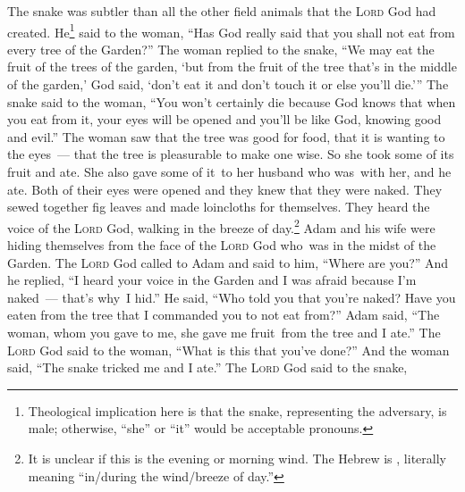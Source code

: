 
\begin{inparaenum}
     The snake was subtler than all the other field animals that the \textsc{Lord} God had created. He\footnote{Theological implication here is that the snake, representing the adversary, is male; otherwise, ``she'' or ``it'' would be acceptable pronouns.} said to the woman, ``Has God really said that you shall not eat from every tree of the Garden?''%
     The woman replied to the snake, ``We may eat the fruit of the trees of the garden,%
     `but from the fruit of the tree that's in the middle of the garden,' God said, `don't eat it and don't touch it or else you'll die.'\thinspace''%
     The snake said to the woman, ``You won't certainly die%
     because God knows that when you eat from it, your eyes will be opened and you'll be like God, knowing good and evil.''%
     The woman saw that the tree was good for food, that it is wanting to the eyes~--- that the tree is pleasurable to make one wise. So she took some of its fruit and ate. She also gave some of it\understood\ to her husband who was\understood\ with her, and he ate.%
     Both of their eyes were opened and they knew that they were naked. They sewed together fig leaves and made loincloths for themselves.%
     They heard the voice of the \textsc{Lord} God, walking in the breeze of day.\footnote{It is unclear if this is the evening or morning wind. The Hebrew is , literally meaning ``in/during the wind/breeze of day.''} Adam and his wife were hiding themselves from the face of the \textsc{Lord} God who\understood\ was in the midst of the Garden.%
     The \textsc{Lord} God called to Adam and said to him, ``Where are you?''%
     And he replied, ``I heard your voice in the Garden and I was afraid because I'm naked~--- that's why\understood\ I hid.''%
     He said, ``Who told you that you're naked? Have you eaten from the tree that I commanded you to not eat from?''%
     Adam said, ``The woman, whom you gave to me, she gave me fruit\understood\ from the tree and I ate.''%
     The \textsc{Lord} God said to the woman, ``What is this that you've done?'' And the woman said, ``The snake tricked me and I ate.''%
     The \textsc{Lord} God said to the snake,\smallskip%
    

\end{inparaenum}
